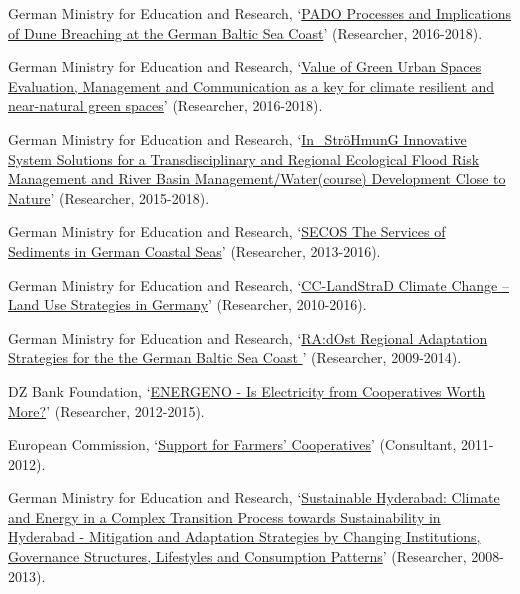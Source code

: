 \documentclass[paper=a4,fontsize=11pt]{scrartcl} %
\newcommand{\FundingEntry}[4]{
        \noindent #1, `#2' (#3, #4).}
\begin{document}
\begin{etaremune}

\item\FundingEntry {German Ministry for Education and Research}{\href{https://www.ioew.de/en/project-single/pado_processes_and_implications_of_dune_breaching_at_the_german_baltic_sea_coast/}{PADO Processes and Implications of Dune Breaching at the German Baltic Sea Coast}}{Researcher}{2016-2018}

\item\FundingEntry {German Ministry for Education and Research}{\href{https://www.ioew.de/en/project-single/value_of_green_urban_spaces/}{Value of Green Urban Spaces Evaluation, Management and Communication as a key for climate resilient and near-natural green spaces}}{Researcher}{2016-2018}


\item\FundingEntry {German Ministry for Education and Research}{\href{https://www.ioew.de/en/project-single/innovative_system_solutions_for_a_transdisciplinary_and_regional_ecological_flood_risk_management_an/}{In\_StröHmunG Innovative System Solutions for a Transdisciplinary and Regional Ecological Flood Risk Management and River Basin Management/Water(course) Development Close to Nature}}{Researcher}{2015-2018}

\item\FundingEntry {German Ministry for Education and Research}{\href{https://secos.deutsche-kuestenforschung.de/}{SECOS The Services of Sediments in German Coastal Seas}}{Researcher}{2013-2016}

\item\FundingEntry {German Ministry for Education and Research}{\href{https://www.cc-landstrad.de/en/}{CC-LandStraD Climate Change – Land Use Strategies in Germany}}{Researcher}{2010-2016}

\item\FundingEntry {German Ministry for Education and Research}{\href{http://www.klimzug-radost.de/en/info}{RA:dOst Regional Adaptation Strategies for the the German Baltic Sea Coast }}{Researcher}{2009-2014}


\item\FundingEntry {DZ Bank Foundation}{\href{https://www.agrar.hu-berlin.de/de/institut/departments/daoe/koopwiss/forschung/energeno}{ENERGENO - Is Electricity from Cooperatives Worth More?}}{Researcher}{2012-2015}

\item\FundingEntry {European Commission}{\href{https://ec.europa.eu/agriculture/external-studies/support-farmers-coop_en}{Support for Farmers’ Cooperatives}}{Consultant}{2011-2012}

\item\FundingEntry {German Ministry for Education and Research}{\href{https://www.iaaw.hu-berlin.de/de/hip/institutes/resecon}{Sustainable Hyderabad: Climate and Energy in a Complex Transition Process towards Sustainability in Hyderabad - Mitigation and Adaptation Strategies by Changing Institutions, Governance Structures, Lifestyles and Consumption Patterns}}{Researcher}{2008-2013}

\end{etaremune}
\end{document}
